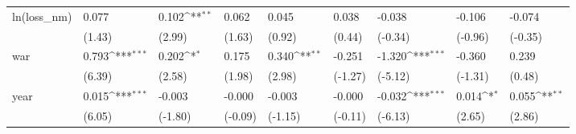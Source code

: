 \def\sym#1{\ifmmode^{#1}\else\(^{#1}\)\fi}
\begin{tabular}{p{1.5cm} p{2cm} p{1.7cm} p{1.7cm} p{1.7cm} p{1.7cm} p{1.7cm} p{1.7cm} p{1.7cm}}
\hline
ln(loss\_nm)     &    0.077         &    0.102\sym{**} &    0.062         &    0.045         &    0.038         &   -0.038         &   -0.106         &   -0.074         \\
                &   (1.43)         &   (2.99)         &   (1.63)         &   (0.92)         &   (0.44)         &  (-0.34)         &  (-0.96)         &  (-0.35)         \\
war             &    0.793\sym{***}&    0.202\sym{*}  &    0.175         &    0.340\sym{**} &   -0.251         &   -1.320\sym{***}&   -0.360         &    0.239         \\
                &   (6.39)         &   (2.58)         &   (1.98)         &   (2.98)         &  (-1.27)         &  (-5.12)         &  (-1.31)         &   (0.48)         \\
year            &    0.015\sym{***}&   -0.003         &   -0.000         &   -0.003         &   -0.000         &   -0.032\sym{***}&    0.014\sym{*}  &    0.055\sym{**} \\
                &   (6.05)         &  (-1.80)         &  (-0.09)         &  (-1.15)         &  (-0.11)         &  (-6.13)         &   (2.65)         &   (2.86)         \\
\end{tabular}
